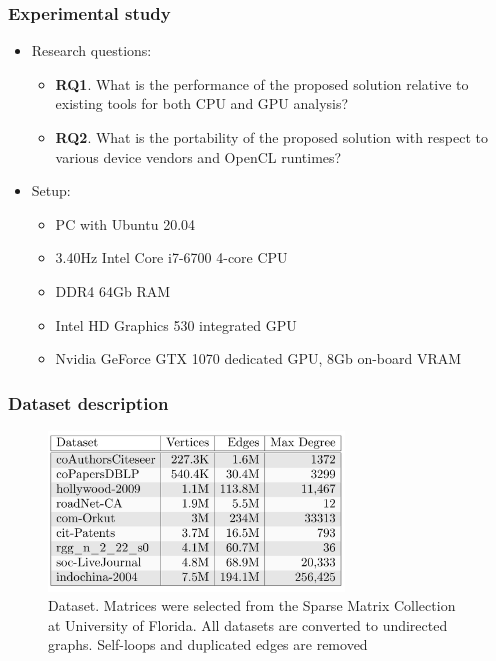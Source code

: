 \documentclass[aspectratio=169,xcolor=table,english]{beamer}
\begin{document}
\begin{frame}[fragile] \frametitle{Experimental study}
    \begin{itemize}
        \item Research questions:
        {
        \begin{itemize}
            \item \textbf{RQ1}. What is the performance of the proposed solution relative to existing tools for both CPU and GPU analysis?

            \item \textbf{RQ2}. What is the portability of the proposed solution with respect to various device vendors and OpenCL runtimes?
        \end{itemize}
        }
        \item Setup: 
        {
        \begin{itemize}
            \item  PC with Ubuntu 20.04
            \item 3.40Hz Intel Core i7-6700 4-core CPU
            \item DDR4 64Gb RAM
            \item Intel HD Graphics 530 integrated GPU
            \item Nvidia GeForce GTX 1070 dedicated GPU, 8Gb on-board VRAM
        \end{itemize}
        }
    \end{itemize}
\end{frame}

\begin{frame}[fragile] \frametitle{Dataset description}
    \begin{center}
    \begin{minipage}[m]{0.9\linewidth}
        \begin{figure}
            \centering
            \includegraphics[width=0.7\textwidth]{figures/exp_dataset_desc.png}
            \caption{Dataset. Matrices were selected from the Sparse Matrix Collection at University of Florida. All datasets are converted to undirected graphs. Self-loops and duplicated edges are removed}
        \end{figure}
    \end{minipage}\hfill   
    \end{center}
\end{frame}
\end{document}
